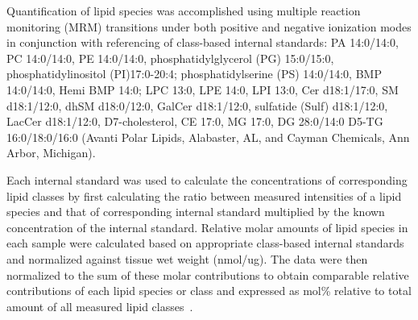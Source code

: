 \documentclass[letterpaper]{article}
\begin{document}
Quantification of lipid species was accomplished using multiple reaction
monitoring (MRM) transitions under both positive and negative ionization
modes in conjunction with referencing of class-based internal standards: PA
14:0/14:0, PC 14:0/14:0, PE 14:0/14:0, phosphatidylglycerol (PG) 15:0/15:0,
phosphatidylinositol (PI)17:0-20:4; phosphatidylserine (PS) 14:0/14:0, BMP
14:0/14:0, Hemi BMP 14:0; LPC 13:0,  LPE 14:0, LPI 13:0, Cer d18:1/17:0, SM
d18:1/12:0, dhSM d18:0/12:0, GalCer d18:1/12:0, sulfatide (Sulf) d18:1/12:0,
LacCer d18:1/12:0, D7-cholesterol, CE 17:0, MG 17:0, DG 28:0/14:0 D5-TG
16:0/18:0/16:0 (Avanti Polar Lipids, Alabaster, AL, and Cayman Chemicals,
Ann Arbor, Michigan). 

Each internal standard was used to calculate the concentrations of
corresponding lipid classes
by first calculating the ratio between measured intensities of a lipid species
and that of corresponding
internal standard multiplied by the known concentration of the internal
standard. 
Relative molar amounts of lipid species in each sample were calculated based
on appropriate class-based internal standards and normalized against tissue
wet weight (nmol/ug). The data were then normalized to the sum of these molar
contributions to obtain comparable relative contributions of each lipid
species or class and expressed as mol\% relative to total amount of all
measured lipid classes~\citep{Chan2017,Guan2013}.
\end{document}
